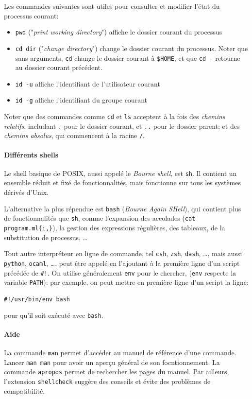 \documentclass[french, toc]{../cs-classes/cs-classes}
\begin{document}
Les commandes suivantes sont utiles pour consulter et modifier l'état du processus courant:
\begin{itemize}
    \item \texttt{pwd} ("\emph{print working directory}") affiche le dossier courant du processus
    \item \texttt{cd dir} ("\emph{change directory}") change le dossier courant du processus. Noter que sans arguments, \texttt{cd} change le dossier courant à \texttt{\$HOME}, et que \texttt{cd -} retourne au dossier courant précédent.
    \item \texttt{id -u} affiche l'identifiant de l'utilisateur courant
    \item \texttt{id -g} affiche l'identifiant du groupe courant
\end{itemize}
Noter que des commandes comme \texttt{cd} et \texttt{ls} acceptent à la fois des \emph{chemins relatifs}, includant \texttt{.} pour le dossier courant, et \texttt{..} pour le dossier parent; et des \emph{chemins absolus}, qui commencent à la racine \texttt{/}.

\paragraph*{Différents shells}
Le shell basique de POSIX, aussi appelé le \emph{Bourne shell}, est \texttt{sh}. Il contient un ensemble réduit et fixé de fonctionnalités, mais fonctionne sur tous les systèmes dérivés d'Unix.

L'alternative la plus répendue est \texttt{bash} (\emph{Bourne Again SHell}), qui contient plus de fonctionnalités que \texttt{sh}, comme l'expansion des accolades (\texttt{cat program.ml\{i,\}}), la gestion des expressions régulières, des tableaux, de la substitution de processus, \dots

Tout autre interpréteur en ligne de commande, tel \texttt{csh}, \texttt{zsh}, \texttt{dash}, \dots, mais aussi \texttt{python}, \texttt{ocaml}, \dots, peut être appelé en l'ajoutant à la première ligne d'un script précédée de \texttt{\#!}. On utilise généralement \texttt{env} pour le chercher, (\texttt{env} respecte la variable \texttt{PATH}): par exemple, on peut mettre en première ligne d'un script la ligne:
\begin{center}
    \texttt{\#!/usr/bin/env bash} 
\end{center}
pour qu'il soit exécuté avec \texttt{bash}.

\paragraph*{Aide}
La commande \texttt{man} permet d'accéder au manuel de référence d'une commande. Lancer \texttt{man man} pour avoir un aperçu général de son focntionnement. La commande \texttt{apropos} permet de rechercher les pages du manuel. Par ailleurs, l'extension \texttt{shellcheck} suggère des conseils et évite des problèmes de compatibilité.
\end{document}
